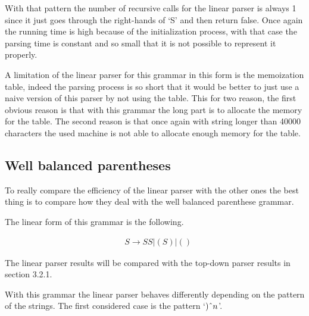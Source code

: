 With that pattern the number of recursive calls for the linear parser is always 1 since it just goes through the right-hands of `S' and then return false.
Once again the running time is high because of the initialization process, with that case the parsing time is constant and so small that it is not possible to represent it properly.

A limitation of the linear parser for this grammar in this form is the memoization table, indeed the parsing process is so short that it would be better to just use a naive version of this parser by not using the table.
This for two reason, the first obvious reason is that with this grammar the long part is to allocate the memory for the table.
The second reason is that once again with string longer than 40000 characters the used machine is not able to allocate enough memory for the table.

\subsection{Well balanced parentheses}

To really compare the efficiency of the linear parser with the other ones the best thing is to compare how they deal with the well balanced parenthese grammar.

The linear form of this grammar is the following.

\begin{align*}
    &S \to SS | (S) | ()
\end{align*}

The linear parser results will be compared with the top-down parser results in section 3.2.1.

With this grammar the linear parser behaves differently depending on the pattern of the strings.
The first considered case is the pattern `$)\string^ n$'.

